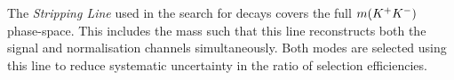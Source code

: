 The \emph{Stripping Line} used in the search for \decay{\Bp}{\Dsp\Kp\Km} decays covers the full $m({{K}^+}{{K}^-})$ phase-space. This includes the \Dzb mass such that this line reconstructs both the signal and normalisation channels simultaneously. 
Both modes are selected using this line to reduce systematic uncertainty in the ratio of selection efficiencies.

